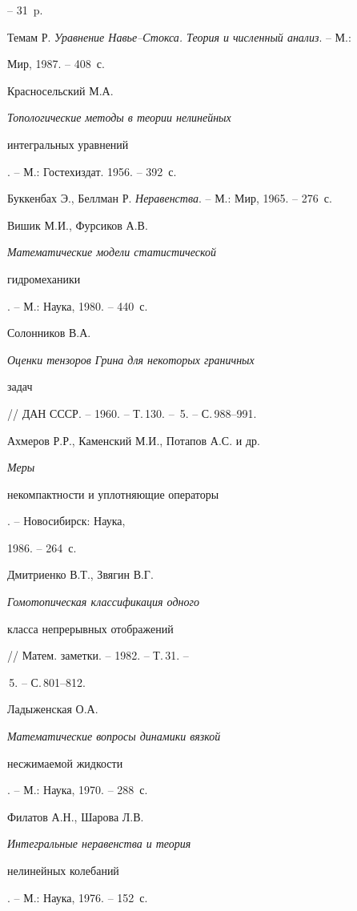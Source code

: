 \begin{thebibliography}{}
-- 31~p.







Темам Р. {\em Уравнение Навье--Стокса. Теория и численный анализ}. -- М.:


Мир, 1987. -- 408~с.







Красносельский М.А. {\em Топологические методы в теории нелинейных


интегральных уравнений}. -- М.: Гостехиздат. 1956. -- 392~с.







Буккенбах Э., Беллман Р. {\em Неравенства}. -- М.: Мир, 1965. -- 276~с.







Вишик М.И., Фурсиков А.В. {\em Математические модели статистической


гидромеханики}. -- М.: Наука, 1980. -- 440~с.







Солонников В.А. {\em Оценки тензоров Грина для некоторых граничных


задач} // ДАН СССР. -- 1960. -- Т.\,130. -- \No\,5. -- С.\,988--991.







Ахмеров Р.Р., Каменский М.И., Потапов А.С. и др. {\em Меры


некомпактности и уплотняющие операторы}. -- Новосибирск: Наука,


1986. -- 264~с.







Дмитриенко В.Т., Звягин В.Г. {\em Гомотопическая классификация одного


класса непрерывных отображений} // Матем. заметки. -- 1982. -- Т.\,31. --


\No\,5. -- С.\,801--812.







Ладыженская О.А. {\em Математические вопросы динамики вязкой


несжимаемой жидкости}. -- М.: Наука, 1970. -- 288~с.







Филатов А.Н., Шарова Л.В. {\em Интегральные неравенства и теория


нелинейных колебаний}. -- М.: Наука, 1976. -- 152~с.





\end{thebibliography}
